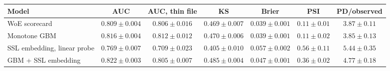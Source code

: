 \begin{tabular}{lcccccc}
\toprule
Model & AUC & AUC, thin file & KS & Brier & PSI & PD/observed \\
\midrule
WoE scorecard & $0.809 \pm 0.004$ & $0.806 \pm 0.016$ & $0.469 \pm 0.007$ & $0.039 \pm 0.001$ & $0.11 \pm 0.01$ & $3.87 \pm 0.11$ \\
Monotone GBM & $0.816 \pm 0.004$ & $0.812 \pm 0.012$ & $0.470 \pm 0.006$ & $0.039 \pm 0.001$ & $0.11 \pm 0.02$ & $3.85 \pm 0.13$ \\
SSL embedding, linear probe & $0.769 \pm 0.007$ & $0.709 \pm 0.023$ & $0.405 \pm 0.010$ & $0.057 \pm 0.002$ & $0.56 \pm 0.11$ & $5.44 \pm 0.35$ \\
GBM + SSL embedding & $0.822 \pm 0.003$ & $0.805 \pm 0.007$ & $0.485 \pm 0.004$ & $0.047 \pm 0.001$ & $0.36 \pm 0.02$ & $4.77 \pm 0.18$ \\
\bottomrule
\end{tabular}
